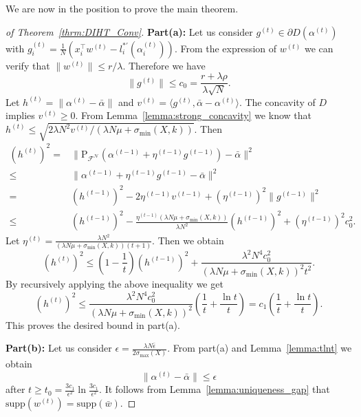\documentclass[11pt]{article}
\newcommand{\supp}{\text{supp}}
\numberwithin{equation}{section}
\numberwithin{table}{section}
\numberwithin{figure}{section}
\begin{document}
We are now in the position to prove the main theorem.
\begin{proof}[of Theorem~\ref{thrm:DIHT_Conv}]
\noindent\textbf{Part(a):} Let us consider $g^{(t)} \in \partial D(\alpha^{(t)})$ with $g_i^{(t)}=\frac{1}{N}(x_i^\top w^{(t)}- l^{*'}_i(\alpha_i^{(t)}))$. From the expression of $w^{(t)}$ we can verify that $\|w^{(t)}\|\le r/\lambda$. Therefore we have
\[
\|g^{(t)}\| \le c_0=\frac{r + \lambda\rho}{\lambda\sqrt{N}}.
\]
Let $h^{(t)} = \|\alpha^{(t)} - \bar \alpha\|$ and $v^{(t)} = \langle g^{(t)}, \bar\alpha -\alpha^{(t)}\rangle$. The concavity of $D$ implies $v^{(t)}\ge 0$. From Lemma~\ref{lemma:strong_concavity} we know that $h^{(t)}\le \sqrt{2\lambda N^2 v^{(t)}/(\lambda N \mu + \sigma_{\min}(X,k))}$.  Then
\[
\begin{aligned}
(h^{(t)})^2 =& \|\mathrm{P}_{\mathcal{F^N}}\left(\alpha^{(t-1)}+\eta^{(t-1)} g^{(t-1)}\right) - \bar \alpha\|^2 \\
\le& \|\alpha^{(t-1)} + \eta^{(t-1)} g^{(t-1)} - \bar \alpha\|^2 \\
=& (h^{(t-1)})^2 - 2\eta^{(t-1)} v^{(t-1)} + (\eta^{(t-1)})^2 \|g^{(t-1)}\|^2 \\
\le& (h^{(t-1)})^2 - \frac{\eta^{(t-1)}(\lambda N \mu + \sigma_{\min}(X,k))}{\lambda N^2} (h^{(t-1)})^2 + (\eta^{(t-1)})^2 c_0^2.
\end{aligned}
\]
Let $\eta^{(t)} = \frac{\lambda N^2}{(\lambda N \mu + \sigma_{\min}(X,k))(t+1)}$. Then we obtain
\[
(h^{(t)})^2 \le \left(1-\frac{1}{t}\right) (h^{(t-1)})^2 + \frac{\lambda^2 N^4 c_0^2}{(\lambda N \mu + \sigma_{\min}(X,k))^2t^2}.
\]
By recursively applying the above inequality we get
\[
(h^{(t)})^2 \le \frac{\lambda^2 N^4 c_0^2}{(\lambda N \mu + \sigma_{\min}(X,k))^2} \left(\frac{1}{t} + \frac{\ln t}{t}\right) = c_1 \left(\frac{1}{t} + \frac{\ln t}{t}\right).
\]
This proves the desired bound in part(a).

\noindent\textbf{Part(b):} Let us consider $\epsilon = \frac{\lambda N \bar\epsilon}{2\sigma_{\max}(X)}$. From part(a) and Lemma~\ref{lemma:tlnt} we obtain
\[
\|\alpha^{(t)} - \bar \alpha\| \le \epsilon
\]
after $t \ge t_0 = \frac{3c_1}{\epsilon^2}\ln \frac{3c_1}{\epsilon^2}$. It follows from Lemma~\ref{lemma:uniqueness_gap} that $\supp(w^{(t)}) = \supp(\bar w)$.


\end{proof}
\end{document}

